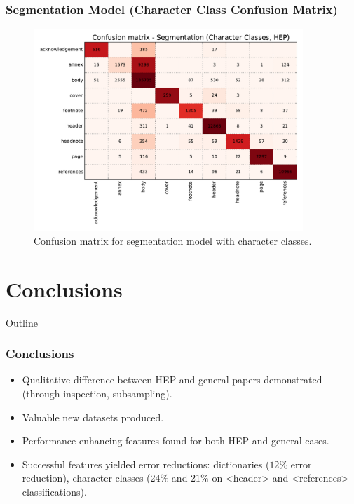\documentclass{beamer}
\begin{document}
\begin{frame}
\frametitle{Segmentation Model (Character Class Confusion Matrix)}
\begin{figure}[h]
\center
\includegraphics[width=4in]{Figures/classes_confusion_segmentation.pdf}
\caption{Confusion matrix for segmentation model with character classes.}
\end{figure}
\end{frame}


\section{Conclusions}


\begin{frame}[noframenumbering]{Outline}
\end{frame}


\begin{frame}
\frametitle{Conclusions}
\begin{itemize}
\item Qualitative difference between HEP and general papers demonstrated (through inspection, subsampling).
\item Valuable new datasets produced.
\item Performance-enhancing features found for both HEP and general cases.
\item Successful features yielded error reductions: dictionaries ($12\%$ error reduction), character classes ($24\%$ and $21\%$ on <header> and <references> classifications).
\end{itemize}
\end{frame}


\end{document}
